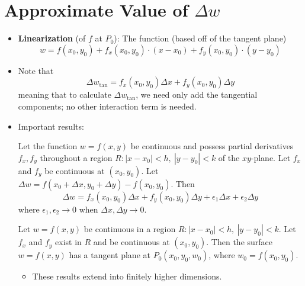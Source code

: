 \documentclass[../main.tex]{subfiles}
\begin{document}
\section{Approximate Value of \texorpdfstring{$\Delta w$}{TEXT}}
\begin{itemize}
    \item \textbf{Linearization} (of $f$ at $P_0$): The function (based off of the tangent plane)
    \begin{equation*}
        w = f(x_0,y_0)+f_x(x_0,y_0)\cdot(x-x_0)+f_y(x_0,y_0)\cdot(y-y_0)
    \end{equation*}
    \item Note that
    \begin{equation*}
        \Delta w_\text{tan} = f_x(x_0,y_0)\Delta x+f_y(x_0,y_0)\Delta y
    \end{equation*}
    meaning that to calculate $\Delta w_\text{tan}$, we need only add the tangential components; no other interaction term is needed.
    \item Important results:
    \begin{thm}
        Let the function $w=f(x,y)$ be continuous and possess partial derivatives $f_x,f_y$ throughout a region $R:|x-x_0|<h,\ |y-y_0|<k$ of the $xy$-plane. Let $f_x$ and $f_y$ be continuous at $(x_0,y_0)$. Let $\Delta w = f(x_0+\Delta x,y_0+\Delta y)-f(x_0,y_0)$. Then
        \begin{equation*}
            \Delta w = f_x(x_0,y_0)\Delta x+f_y(x_0,y_0)\Delta y+\epsilon_1\Delta x+\epsilon_2\Delta y
        \end{equation*}
        where $\epsilon_1,\epsilon_2\to 0$ when $\Delta x,\Delta y\to 0$.
    \end{thm}
    \begin{cly}
        Let $w=f(x,y)$ be continuous in a region $R:|x-x_0|<h,\ |y-y_0|<k$. Let $f_x$ and $f_y$ exist in $R$ and be continuous at $(x_0,y_0)$. Then the surface $w=f(x,y)$ has a tangent plane at $P_0(x_0,y_0,w_0)$, where $w_0=f(x_0,y_0)$.
    \end{cly}
    \begin{itemize}
        \item These results extend into finitely higher dimensions.
    \end{itemize}
\end{itemize}
\end{document}

